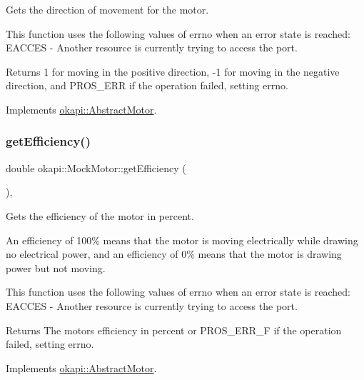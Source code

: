 Gets the direction of movement for the motor. 

This function uses the following values of errno when an error state is reached\+: E\+A\+C\+C\+ES -\/ Another resource is currently trying to access the port.

\begin{DoxyReturn}{Returns}
1 for moving in the positive direction, -\/1 for moving in the negative direction, and P\+R\+O\+S\+\_\+\+E\+RR if the operation failed, setting errno. 
\end{DoxyReturn}


Implements \mbox{\hyperlink{classokapi_1_1AbstractMotor_a94763d1700bd91b995333b012c0b683f}{okapi\+::\+Abstract\+Motor}}.

\mbox{\label{classokapi_1_1MockMotor_adebb84d5230d71b1d0cee5f4c5de9a5f}} 
\subsubsection{\texorpdfstring{getEfficiency()}{getEfficiency()}}
{\footnotesize\ttfamily double okapi\+::\+Mock\+Motor\+::get\+Efficiency (\begin{DoxyParamCaption}{ }\end{DoxyParamCaption})\hspace{0.3cm}{\ttfamily [override]}, {\ttfamily [virtual]}}



Gets the efficiency of the motor in percent. 

An efficiency of 100\% means that the motor is moving electrically while drawing no electrical power, and an efficiency of 0\% means that the motor is drawing power but not moving.

This function uses the following values of errno when an error state is reached\+: E\+A\+C\+C\+ES -\/ Another resource is currently trying to access the port.

\begin{DoxyReturn}{Returns}
The motor\textquotesingle{}s efficiency in percent or P\+R\+O\+S\+\_\+\+E\+R\+R\+\_\+F if the operation failed, setting errno. 
\end{DoxyReturn}


Implements \mbox{\hyperlink{classokapi_1_1AbstractMotor_a27a6e3ec007619a9b91f9d6ebc61e613}{okapi\+::\+Abstract\+Motor}}.

